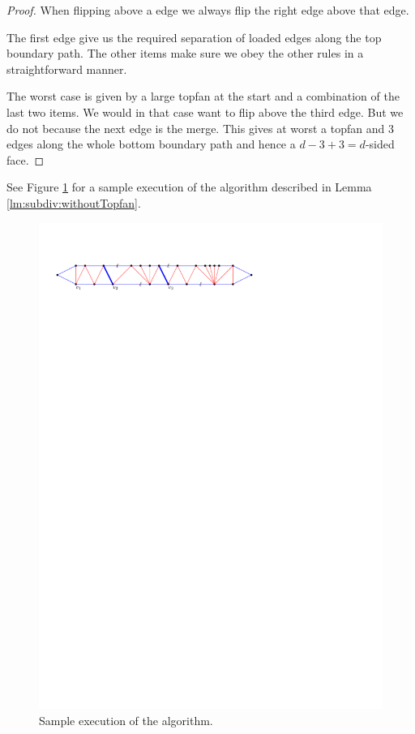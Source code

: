 \begin{proof}
  When flipping above a edge we always flip the right edge above that edge.

  The first edge give us the required separation of loaded edges along the top boundary path. The other items make sure we obey the other rules in a straightforward manner.

  The worst case is given by a large topfan at the start and  a combination of the last two items. We would in that case want to flip above the third edge. But we do not because the next edge is the merge. This gives at worst a topfan and 3 edges along the whole bottom boundary path and hence a $ d - 3 +3 = d$-sided face.
  \end{proof}

  See Figure \ref{fig:subdiv:sampleExecution} for a sample execution of the algorithm described in Lemma \ref{lm:subdiv:withoutTopfan}.

  \begin{figure}[h]
    \centering
    \includegraphics[scale=1]{blueFaceSubdivision/img/sampleExecution}
    \caption{Sample execution of the algorithm.}
    \label{fig:subdiv:sampleExecution}
  \end{figure}

